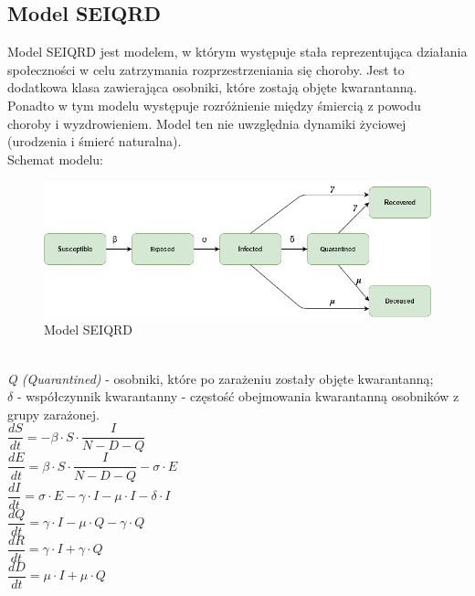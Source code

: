 \documentclass[12pt,a4paper]{article}
\begin{document}
\subsection{Model SEIQRD}
Model SEIQRD jest modelem, w którym występuje stała reprezentująca działania społeczności w celu zatrzymania rozprzestrzeniania się choroby. Jest to dodatkowa klasa zawierająca osobniki, które zostają objęte kwarantanną. Ponadto w tym modelu występuje rozróżnienie między śmiercią z powodu choroby i wyzdrowieniem. Model ten nie uwzględnia dynamiki życiowej (urodzenia i śmierć naturalna).\\
Schemat modelu:
\begin{figure}[h!]
\centering
\includegraphics[width=1.0\textwidth]{Schematy/SEIQRD}
\caption{Model SEIQRD} 
\label{fig:Model SEIQRD}
\end{figure}\\
\textit{Q (Quarantined)} - osobniki, które po zarażeniu zostały objęte kwarantanną;\\
\textit{ $\delta$ } - współczynnik kwarantanny - częstość obejmowania kwarantanną osobników z grupy zarażonej.\\
$\dfrac{dS}{dt} = - \beta\cdot{S}\cdot\dfrac{I}{N-D-Q}$\\
$\dfrac{dE}{dt} = \beta\cdot{S}\cdot\dfrac{I}{N-D-Q} - \sigma\cdot{E}$\\
$\dfrac{dI}{dt} = \sigma\cdot{E} - \gamma\cdot{I} - \mu\cdot{I} - \delta\cdot{I}$\\
$\dfrac{dQ}{dt} = \gamma\cdot{I} - \mu\cdot{Q} - \gamma\cdot{Q}$\\
$\dfrac{dR}{dt} = \gamma\cdot{I} + \gamma\cdot{Q}$\\
$\dfrac{dD}{dt} = \mu\cdot{I} + \mu\cdot{Q}$
\end{document}

